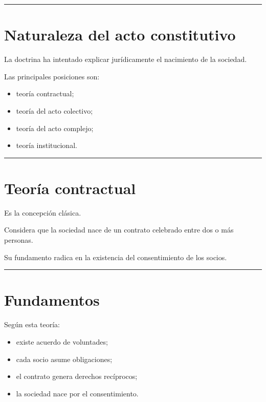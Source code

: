 \documentclass[
  spanish,
  letterpaper,
  DIV=11,
  numbers=noendperiod]{scrartcl}
\providecommand{\tightlist}{%
  \setlength{\itemsep}{0pt}\setlength{\parskip}{0pt}}
\begin{document}
\begin{center}\rule{0.5\linewidth}{0.5pt}\end{center}

\section{Naturaleza del acto
constitutivo}\label{naturaleza-del-acto-constitutivo}

La doctrina ha intentado explicar jurídicamente el nacimiento de la
sociedad.

Las principales posiciones son:

\begin{itemize}
\tightlist
\item
  teoría contractual;
\item
  teoría del acto colectivo;
\item
  teoría del acto complejo;
\item
  teoría institucional.
\end{itemize}

\begin{center}\rule{0.5\linewidth}{0.5pt}\end{center}

\section{Teoría contractual}\label{teoruxeda-contractual}

Es la concepción clásica.

Considera que la sociedad nace de un contrato celebrado entre dos o más
personas.

Su fundamento radica en la existencia del consentimiento de los socios.

\begin{center}\rule{0.5\linewidth}{0.5pt}\end{center}

\section{Fundamentos}\label{fundamentos}

Según esta teoría:

\begin{itemize}
\tightlist
\item
  existe acuerdo de voluntades;
\item
  cada socio asume obligaciones;
\item
  el contrato genera derechos recíprocos;
\item
  la sociedad nace por el consentimiento.
\end{itemize}
\end{document}
